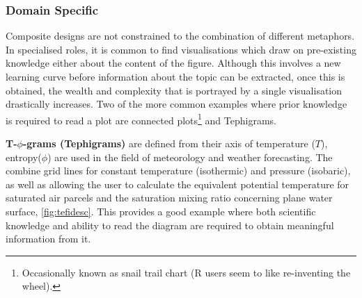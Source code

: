 \subsubsection{Domain Specific}




Composite designs are not constrained to the combination of different metaphors. In specialised roles, it is common to find visualisations which draw on pre-existing knowledge either about the content of the figure. Although this involves a new learning curve before information about the topic can be extracted, once this is obtained, the wealth and complexity that is portrayed by a single visualisation drastically increases. Two of the more common examples where prior knowledge is required to read a plot are connected plots\footnote{ Occasionally known as snail trail chart (R users seem to like re-inventing the wheel). } and Tephigrams.

\textbf{T-$\phi$-grams (Tephigrams)} are defined from their axis of temperature ($T$), entropy($\phi$) are used in the field of meteorology and weather forecasting. The combine grid lines for constant temperature (isothermic) and pressure (isobaric), as well as allowing the user to calculate the equivalent potential temperature for saturated air parcels and the saturation mixing ratio concerning plane water surface, \autoref{fig:tefidesc}. This provides a good example where both scientific knowledge and ability to read the diagram are required to obtain meaningful information from it.

